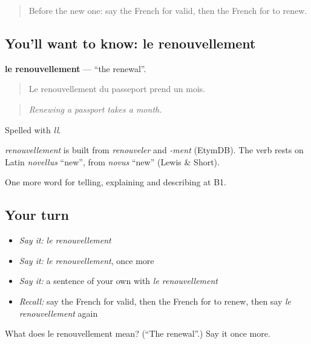 \label{lesson:FR-C384-renouvellement}



\begin{quote}
Before the new one: say the French for valid, then the French for to renew.
\end{quote}

\subsection*{You'll want to know: le renouvellement}
\textbf{le renouvellement} — \textquotedblleft{}the renewal\textquotedblright{}.

\begin{quote}
Le renouvellement du passeport prend un mois.
\end{quote}

\begin{quote}
\emph{Renewing a passport takes a month.}
\end{quote}

Spelled with \emph{ll}.

\begin{cousinweb}
\emph{renouvellement} is built from \emph{renouveler} and \emph{-ment} (EtymDB). The verb rests on Latin \emph{novellus} \textquotedblleft{}new\textquotedblright{}, from \emph{novus} \textquotedblleft{}new\textquotedblright{} (Lewis \& Short).
\end{cousinweb}

\begin{grammarlens}[title={What you've built}]
One more word for telling, explaining and describing at B1.
\end{grammarlens}

\subsection*{Your turn}
\begin{itemize}
\raggedright
  \item \emph{Say it:} \emph{le renouvellement}
  \item \emph{Say it:} \emph{le renouvellement}, once more
  \item \emph{Say it:} a sentence of your own with \emph{le renouvellement}
  \item \emph{Recall:} say the French for valid, then the French for to renew, then say \emph{le renouvellement} again
\end{itemize}

\begin{tcolorbox}[breakable,colback=teal!4,colframe=teal!35!black,title={Before you move on}]
What does le renouvellement mean? (\textquotedblleft{}The renewal\textquotedblright{}.) Say it once more.
\end{tcolorbox}
